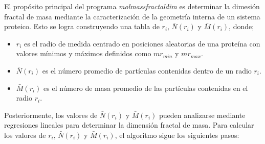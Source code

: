  
 
 
 
 
 
 
 
 
 
 
 
 

El propósito principal del programa \textit{molmassfractaldim} es determinar la dimesi\'{o}n fractal de masa mediante la caracterizaci\'{o}n de la geometría interna de un sistema proteico. Esto se logra construyendo una tabla de \(r_i\), \( \bar{N}(r_i)\) y \( \bar{M}(r_i)\), donde;

\begin{itemize}
	\item \(r_i\) es el radio de medida centrado en posiciones aleatorias de una prote\'{i}na con valores m\'{i}nimos y m\'{a}ximos definidos como \(mr_{min}\) y \(mr_{max}\).
	\item \( \bar{N}(r_i)\) es el número promedio de partículas contenidas dentro de un radio \(r_i\). 
	\item  \( \bar{M}(r_i)\) es el n\'{u}mero de masa promedio de las part\'{i}culas contenidas en el radio \(r_i\).
\end{itemize}








Posteriormente, los valores de \( \bar{N}(r_i) \) y \( \bar{M}(r_i)\) pueden analizarse mediante regresiones lineales para determinar la dimensi\'{o}n fractal de masa. Para calcular los valores de \(r_i\), \( \bar{N}(r_i)\) y \( \bar{M}(r_i)\), el algoritmo sigue los siguientes pasos:


